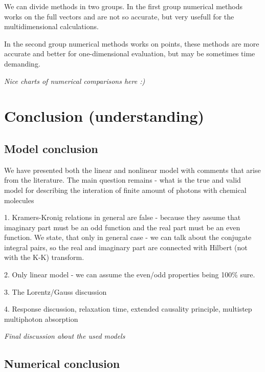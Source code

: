 \documentclass[12pt,twoside,a4paper]{article}
\def\emptyline{\vspace{12pt}}
\numberwithin{equation}{subsection}
\numberwithin{figure}{subsection}
\begin{document}
We can divide methods in two groups.  In the first group numerical methods works on the full vectors and are
not so accurate, but very usefull for the multidimensional calculations.

In the second group numerical methods works on points, these methods are more accurate and better for one-dimensional evaluation,
but may be sometimes time demanding.

\textit{Nice charts of numerical comparisons here :)}

\section{Conclusion (understanding)} \label{chap:conclusion}

\subsection{Model conclusion} \label{chap:conclusion_model}

We have presented both the linear and nonlinear model with comments that arise from the literature. The main question remains -
what is the true and valid model for describing the interation of finite amount of photons with chemical molecules

\emptyline

1. Kramers-Kronig relations in general are false - because they assume that imaginary part must be an odd function and the real
part must be an even function. We state, that only in general case - we can talk about the conjugate integral pairs, so the real
and imaginary part are connected with Hilbert (not with the K-K) transform.

\emptyline

2. Only linear model - we can assume the even/odd properties being 100\% sure.

\emptyline

3. The Lorentz/Gauss discussion

\emptyline

4. Response discussion, relaxation time, extended causality principle, multistep multiphoton absorption

\textit{Final discussion about the used models}

\subsection{Numerical conclusion} \label{chap:conclusion_numerical}
\end{document}
